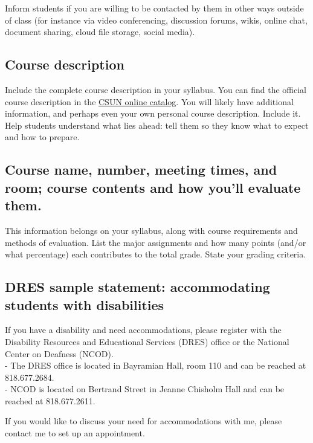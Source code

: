 \documentclass[
  letterpaper,
  DIV=11,
  numbers=noendperiod]{scrartcl}
\begin{document}
Inform students if you are willing to be contacted by them in other ways
outside of class (for instance via video conferencing, discussion
forums, wikis, online chat, document sharing, cloud file storage, social
media).

\subsection{Course description}\label{course-description}

Include the complete course description in your syllabus. You can find
the official course description in the
\href{https://catalog.csun.edu}{CSUN online catalog}. You will likely
have additional information, and perhaps even your own personal course
description. Include it. Help students understand what lies ahead: tell
them so they know what to expect and how to prepare.

\subsection{Course name, number, meeting times, and room; course
contents and how you'll evaluate
them.}\label{course-name-number-meeting-times-and-room-course-contents-and-how-youll-evaluate-them.}

This information belongs on your syllabus, along with course
requirements and methods of evaluation. List the major assignments and
how many points (and/or what percentage) each contributes to the total
grade. State your grading criteria.

\subsection{DRES sample statement: accommodating students with
disabilities}\label{dres-sample-statement-accommodating-students-with-disabilities}

If you have a disability and need accommodations, please register with
the Disability Resources and Educational Services (DRES) office or the
National Center on Deafness (NCOD).\\
- The DRES office is located in Bayramian Hall, room 110 and can be
reached at 818.677.2684.\\
- NCOD is located on Bertrand Street in Jeanne Chisholm Hall and can be
reached at 818.677.2611.

If you would like to discuss your need for accommodations with me,
please contact me to set up an appointment.
\end{document}
